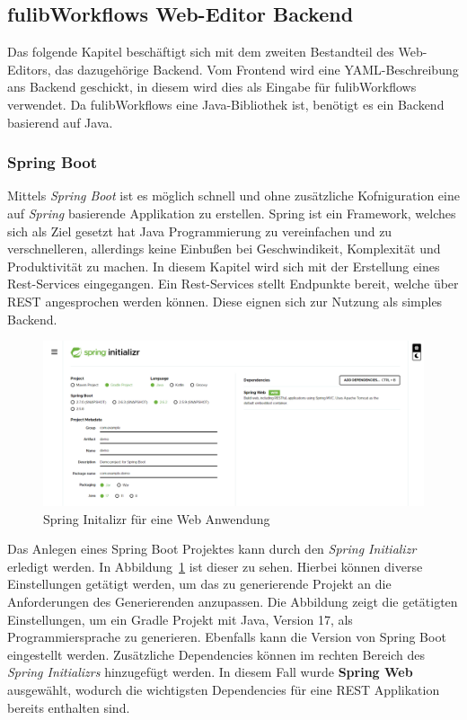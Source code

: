 \subsection{fulibWorkflows Web-Editor Backend}\label{subsec:backend}
Das folgende Kapitel beschäftigt sich mit dem zweiten Bestandteil des Web-Editors, das dazugehörige Backend.
Vom Frontend wird eine YAML-Beschreibung ans Backend geschickt, in diesem wird dies als Eingabe für fulibWorkflows verwendet.
Da fulibWorkflows eine Java-Bibliothek ist, benötigt es ein Backend basierend auf Java.

\subsubsection{Spring Boot}
Mittels \textit{Spring Boot} ist es möglich schnell und ohne zusätzliche Kofniguration eine auf \textit{Spring} basierende Applikation zu erstellen.\cite*{springBoot}
Spring ist ein Framework, welches sich als Ziel gesetzt hat Java Programmierung zu vereinfachen und zu verschnelleren, allerdings keine Einbußen
bei Geschwindikeit, Komplexität und Produktivität zu machen.\cite*{spring}
In diesem Kapitel wird sich mit der Erstellung eines Rest-Services eingegangen.
Ein Rest-Services stellt Endpunkte bereit, welche über REST angesprochen werden können.
Diese eignen sich zur Nutzung als simples Backend.

\begin{figure}[h]
    \centering
    \includegraphics[width=1.0\textwidth]{images/2.2/spring-init}
    \caption{Spring Initalizr für eine Web Anwendung}
    \label{fig:spring-init}
\end{figure}


Das Anlegen eines Spring Boot Projektes kann durch den \textit{Spring Initializr} erledigt werden.\cite*{sbinit}
In Abbildung~\ref{fig:spring-init} ist dieser zu sehen.
Hierbei können diverse Einstellungen getätigt werden, um das zu generierende Projekt an die Anforderungen des Generierenden anzupassen.
Die Abbildung zeigt die getätigten Einstellungen, um ein Gradle Projekt mit Java, Version 17, als Programmiersprache zu generieren.
Ebenfalls kann die Version von Spring Boot eingestellt werden.
Zusätzliche Dependencies können im rechten Bereich des \textit{Spring Initializrs} hinzugefügt werden.
In diesem Fall wurde \textbf{Spring Web} ausgewählt, wodurch die wichtigsten Dependencies für eine REST Applikation bereits enthalten sind.

